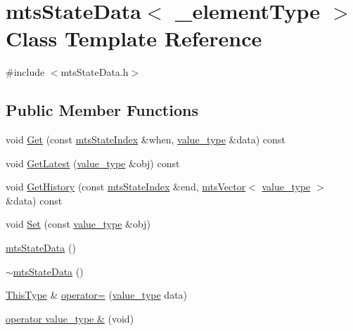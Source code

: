 \hypertarget{classmts_state_data}{\section{mts\-State\-Data$<$ \-\_\-element\-Type $>$ Class Template Reference}
\label{classmts_state_data}
}


{\ttfamily \#include $<$mts\-State\-Data.\-h$>$}

\subsection*{Public Member Functions}
\begin{DoxyCompactItemize}
\item 
void \hyperlink{classmts_state_data_a8183b2f36ae85ea50894047cb93fcc50}{Get} (const \hyperlink{classmts_state_index}{mts\-State\-Index} \&when, \hyperlink{classmts_state_data_aeffdf781c6be5cac19466d4f3d25b3a3}{value\-\_\-type} \&data) const 
\item 
void \hyperlink{classmts_state_data_a1a67b4827040969bf39a7c501cc3f210}{Get\-Latest} (\hyperlink{classmts_state_data_aeffdf781c6be5cac19466d4f3d25b3a3}{value\-\_\-type} \&obj) const 
\item 
void \hyperlink{classmts_state_data_a0e57052afa72058a9b212e620c2b6bed}{Get\-History} (const \hyperlink{classmts_state_index}{mts\-State\-Index} \&end, \hyperlink{classmts_vector}{mts\-Vector}$<$ \hyperlink{classmts_state_data_aeffdf781c6be5cac19466d4f3d25b3a3}{value\-\_\-type} $>$ \&data) const 
\item 
void \hyperlink{classmts_state_data_a5832b112fbcf7e63ab366e3dc4ffae70}{Set} (const \hyperlink{classmts_state_data_aeffdf781c6be5cac19466d4f3d25b3a3}{value\-\_\-type} \&obj)
\item 
\hyperlink{classmts_state_data_a12c7e484ccac76e8c5551b53d1a42a25}{mts\-State\-Data} ()
\item 
\hyperlink{classmts_state_data_a0f79aa7136a7bbd819c27d7efcc3dfe4}{$\sim$mts\-State\-Data} ()
\item 
\hyperlink{classmts_state_data_aaa07d52871cdcbe7388b69bbcf1b114a}{This\-Type} \& \hyperlink{classmts_state_data_a5a75e7d54ef66a9b03c4a643af42c58e}{operator=} (\hyperlink{classmts_state_data_aeffdf781c6be5cac19466d4f3d25b3a3}{value\-\_\-type} data)
\item 
\hyperlink{classmts_state_data_a729478ccf1a9d8b35cd644567f7ecd5e}{operator value\-\_\-type \&} (void)
\item 

\end{DoxyCompactItemize}
